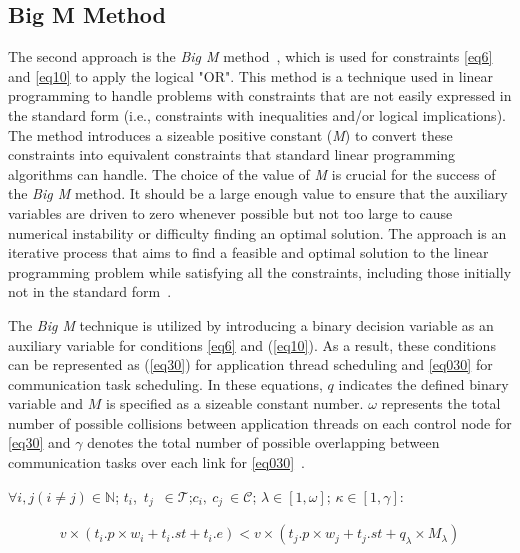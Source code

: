     \subsection{Big M Method}
    The second approach is the \textit{Big M} method~\cite{williams2013model}, which is used for constraints \eqref{eq6} and \eqref{eq10} to apply the logical "OR". This method is a technique used in linear programming to handle problems with constraints that are not easily expressed in the standard form (i.e., constraints with inequalities and/or logical implications). The method introduces a sizeable positive constant (\textit{M}) to convert these constraints into equivalent constraints that standard linear programming algorithms can handle. The choice of the value of \textit{M} is crucial for the success of the \textit{Big M} method. It should be a large enough value to ensure that the auxiliary variables are driven to zero whenever possible but not too large to cause numerical instability or difficulty finding an optimal solution. The approach is an iterative process that aims to find a feasible and optimal solution to the linear programming problem while satisfying all the constraints, including those initially not in the standard form~\cite{williams2013model, arsham2006big, askaripoor2023designer}.
    
    The \textit{Big M} technique is utilized by introducing a binary decision variable as an auxiliary variable for conditions \eqref{eq6} and (\ref{eq10}). As a result, these conditions can be represented as (\ref{eq30}) for application thread scheduling and \eqref{eq030} for communication task scheduling. In these equations, $q$ indicates the defined binary variable and $M$ is specified as a sizeable constant number. $\omega$ represents the total number of possible collisions between application threads on each control node for \eqref{eq30} and $\gamma$ denotes the total number of possible overlapping between communication tasks over each link for \eqref{eq030}~\cite{askaripoor2023designer}.\newline
    
         $\forall i, j (i \neq j) \in \mathbb{N}$; ${t_i}$,~${t_j}$~$\in\mathcal{T}$;${c_i},~{c_j}~\in \mathcal{C}$;
    $\lambda \in [1, \omega]$; $\kappa \in [1, \gamma]$:\newline 

    \begin{equation}
    	\begin{split}	
    	v \times ({t_i}.{p} \times {w_i} + {t_i}.{st} + {t_i}.{e}) <
        v \times ({t_j}.{p} \times {w_j} +  {t_j}.{st} + q_\lambda \times M_\lambda)
    	\label{eq30}
    	\end{split}
    \end{equation}
    
